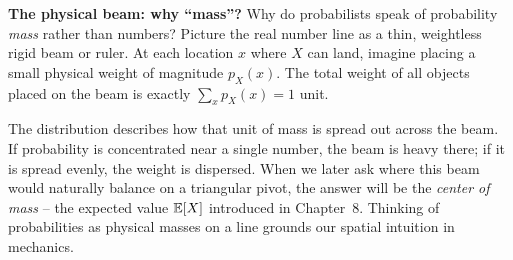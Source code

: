 \begin{intuitionbox}
\textbf{The physical beam: why ``mass''?}
Why do probabilists speak of probability \emph{mass} rather than numbers?
Picture the real number line as a thin, weightless rigid beam or ruler. At each location
$x$ where $X$ can land, imagine placing a small physical weight of magnitude $p_X(x)$.
The total weight of all objects placed on the beam is exactly $\sum_x p_X(x) = 1$ unit.

The distribution describes how that unit of mass is spread out across the beam. If
probability is concentrated near a single number, the beam is heavy there; if it is
spread evenly, the weight is dispersed. When we later ask where this beam would naturally
balance on a triangular pivot, the answer will be the \emph{center of mass} -- the
expected value $\operatorname{\mathbb{E}}[X]$ introduced in Chapter~8. Thinking of probabilities
as physical masses on a line grounds our spatial intuition in mechanics.
\end{intuitionbox}

